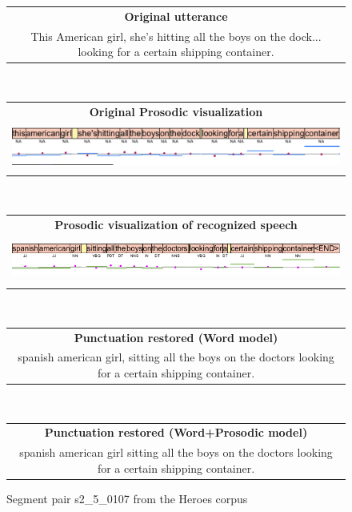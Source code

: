 \begin{figure}[h]
    \centering
    \begin{minipage}[t]{3.5\textwidth}
    \begin{tabular}{c}
    \textbf{Original utterance}\\
    This American girl, she's hitting all the boys on the dock... looking for a certain shipping container. \\
    \end{tabular}
    \end{minipage}
    \\
    \begin{minipage}[t]{3\textwidth}
    \begin{tabular}{c}
    \textbf{Original Prosodic visualization}\\
    \includegraphics[height=1.5cm]{img/s2_5_0107_asr.png} \\
    \end{tabular}
    \end{minipage}
    \\
    \begin{minipage}[t]{3\textwidth}
    \begin{tabular}{c}
    \textbf{Prosodic visualization of recognized speech}\\
    \includegraphics[height=1.5cm]{img/s2_5_0107.png} \\
    \end{tabular}
    \end{minipage}
    \\
    \begin{minipage}[t]{2.2\textwidth}
    \begin{tabular}{c}
    \textbf{Punctuation restored (Word model)}\\
    spanish american girl, sitting all the boys on the doctors looking for a certain shipping container.   \\
    \end{tabular}
    \end{minipage}
    \\
    \begin{minipage}[t]{2.2\textwidth}
    \begin{tabular}{c}
    \textbf{Punctuation restored (Word+Prosodic model)}\\
    spanish american girl sitting all the boys on the doctors looking for a certain shipping container.  \\
    \end{tabular}
    \end{minipage}
    \caption{Segment pair s2\_5\_0107 from the Heroes corpus}
    \label{figure:heroes_pp_2}
\end{figure}

